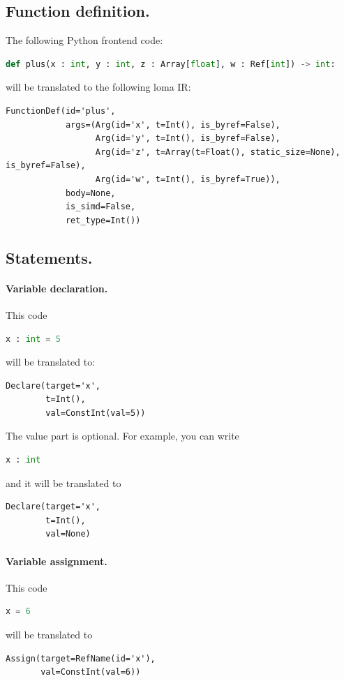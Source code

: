 \subsection{Function definition.} 
The following Python frontend code:
\begin{lstlisting}[language=Python]
def plus(x : int, y : int, z : Array[float], w : Ref[int]) -> int:
\end{lstlisting}
will be translated to the following loma IR:
\begin{lstlisting}
FunctionDef(id='plus',
            args=(Arg(id='x', t=Int(), is_byref=False),
                  Arg(id='y', t=Int(), is_byref=False),
                  Arg(id='z', t=Array(t=Float(), static_size=None), is_byref=False),
                  Arg(id='w', t=Int(), is_byref=True)),
            body=None,
            is_simd=False,
            ret_type=Int())
\end{lstlisting}

\subsection{Statements.} 

\paragraph{Variable declaration.} This code
\begin{lstlisting}[language=Python]
x : int = 5
\end{lstlisting}
will be translated to:
\begin{lstlisting}
Declare(target='x',
        t=Int(),
        val=ConstInt(val=5))
\end{lstlisting}

The value part is optional. For example, you can write
\begin{lstlisting}[language=Python]
x : int
\end{lstlisting}
and it will be translated to
\begin{lstlisting}
Declare(target='x',
        t=Int(),
        val=None)
\end{lstlisting}

\paragraph{Variable assignment.} This code
\begin{lstlisting}[language=Python]
x = 6
\end{lstlisting}
will be translated to
\begin{lstlisting}
Assign(target=RefName(id='x'),
       val=ConstInt(val=6))
\end{lstlisting}

